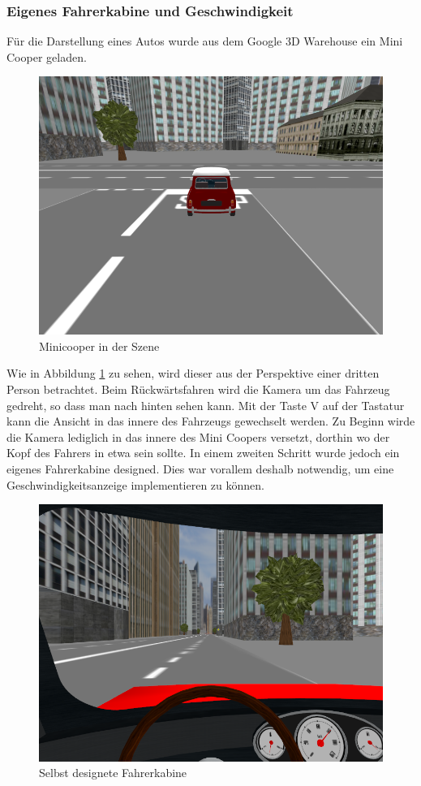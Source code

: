 \subsubsection{Eigenes Fahrerkabine und Geschwindigkeit}
Für die Darstellung eines Autos wurde aus dem Google 3D Warehouse ein Mini Cooper geladen. 
\begin{figure}[htbp]
\centering 
\includegraphics[scale=0.6]{src/screenshot_minicooper.png}
\caption{Minicooper in der Szene} %
\label{screenshot_minicooper} %
\end{figure}
Wie in Abbildung \ref{screenshot_minicooper} zu sehen, wird dieser aus der Perspektive einer dritten Person betrachtet. Beim Rückwärtsfahren wird die Kamera um das Fahrzeug gedreht, so dass man nach hinten sehen kann. Mit der Taste V auf der Tastatur kann die Ansicht in das innere des Fahrzeugs gewechselt werden. Zu Beginn wirde die Kamera lediglich in das innere des Mini Coopers versetzt, dorthin wo der Kopf des Fahrers in etwa sein sollte. In einem zweiten Schritt wurde jedoch ein eigenes Fahrerkabine designed. Dies war vorallem deshalb notwendig, um eine Geschwindigkeitsanzeige implementieren zu können. 
\begin{figure}[htbp]
\centering 
\includegraphics[scale=0.6]{src/screenshot_cockpit.png}
\caption{Selbst designete Fahrerkabine} %
\label{screenshot_cockpit} %
\end{figure}
